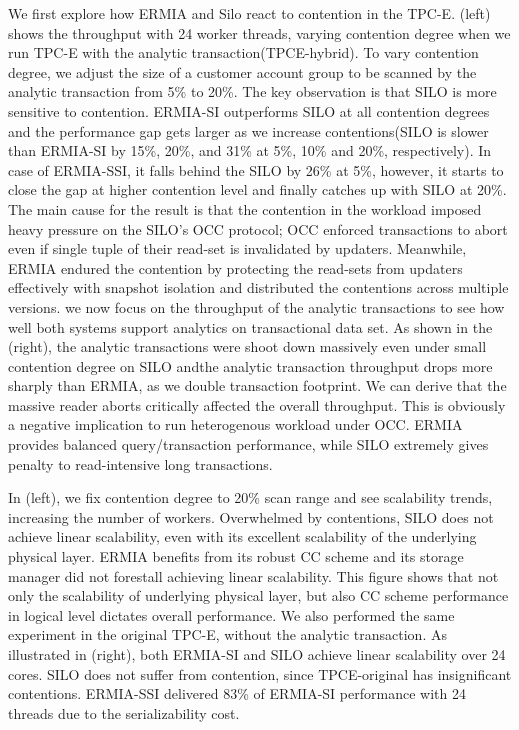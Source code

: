 We first explore how ERMIA and Silo react to contention in the TPC-E. (left) shows the throughput with 24 worker threads, varying contention degree when we run TPC-E with the analytic transaction(TPCE-hybrid). To vary contention degree, we adjust the size of a customer account group to be scanned by the analytic transaction from 5\% to 20\%. The key observation is that SILO is more sensitive to contention. ERMIA-SI outperforms SILO at all contention degrees and the performance gap gets larger as we increase contentions(SILO is slower than ERMIA-SI by 15\%, 20\%, and 31\% at 5\%, 10\% and 20\%, respectively). In case of ERMIA-SSI, it falls behind the SILO by 26\% at 5\%, however, it starts to close the gap at higher contention level and finally catches up with SILO at 20\%. 
The main cause for the result is that the contention in the workload imposed heavy pressure on the SILO's OCC protocol; OCC enforced transactions to abort even if single tuple of their read-set is invalidated by updaters. Meanwhile, ERMIA endured the contention by protecting the read-sets from updaters effectively with snapshot isolation and distributed the contentions across multiple versions. 
we now focus on the throughput of the analytic transactions to see how well both systems support analytics on transactional data set. As shown in the (right), the analytic transactions were shoot down massively even under small contention degree on SILO andthe analytic transaction throughput drops more sharply than ERMIA, as we double transaction footprint. We can derive that the massive reader aborts critically affected the overall throughput. This is obviously a negative implication to run heterogenous workload under OCC. ERMIA provides balanced query/transaction performance, while SILO extremely gives penalty to read-intensive long transactions. 

In (left), we fix contention degree to 20\% scan range and see scalability trends, increasing the number of workers. Overwhelmed by contentions, SILO does not achieve linear scalability, even with its excellent scalability of the underlying physical layer. ERMIA benefits from its robust CC scheme and its storage manager did not forestall achieving linear scalability. This figure shows that not only the scalability of underlying physical layer, but also CC scheme performance in logical level dictates overall performance. We also performed the same experiment in the original TPC-E, without the analytic transaction. As illustrated in (right), both ERMIA-SI and SILO achieve linear scalability over 24 cores. SILO does not suffer from contention, since TPCE-original has insignificant contentions. ERMIA-SSI delivered 83\% of ERMIA-SI performance with 24 threads due to the serializability cost.

